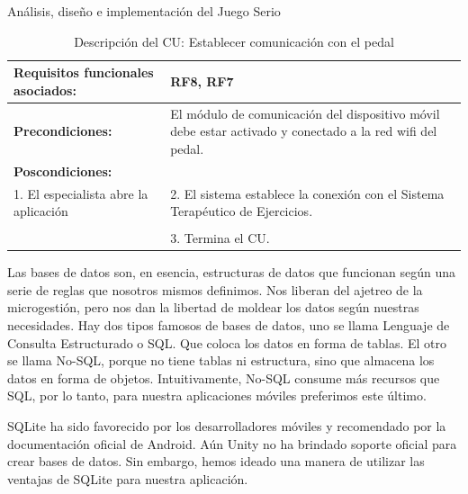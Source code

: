 \begin{thesischapter}{2} {Análisis, diseño e implementación del Juego Serio}
\begin{center}
\begin{table}
\begin{tabularx}{0.95\textwidth}{|X|X|}
                \textbf{Requisitos funcionales asociados:} & RF8, RF7 \\\hline
                \textbf{Precondiciones:} & El módulo de comunicación del dispositivo móvil debe estar activado y conectado a la red wifi del pedal. \\\hline
                \textbf{Poscondiciones:} &  \\\hline
                
                1. El especialista abre la aplicación & 2. El sistema establece la conexión con el Sistema Terapéutico de Ejercicios. \\\\ &3. Termina el CU. \\\hline
            \end{tabularx}

            \caption{Descripción del CU: Establecer comunicación con el pedal}
        \end{table}
    \end{center}
    
    
    



    Las bases de datos son, en esencia, estructuras de datos que funcionan según una serie de reglas que nosotros mismos 
    definimos. Nos liberan del ajetreo de la microgestión, pero nos dan la libertad de moldear los datos según nuestras 
    necesidades. Hay dos tipos famosos de bases de datos, uno se llama Lenguaje de Consulta Estructurado o SQL. Que coloca 
    los datos en forma de tablas. El otro se llama No-SQL, porque no tiene tablas ni estructura, sino que almacena los 
    datos en forma de objetos. Intuitivamente, No-SQL consume más recursos que SQL, por lo tanto, para nuestra aplicaciones 
    móviles preferimos este último.

    \vspace{10pt}
    SQLite ha sido favorecido por los desarrolladores móviles y recomendado por la documentación oficial de Android. Aún  
    Unity no ha brindado soporte oficial para crear bases de datos. Sin embargo, hemos ideado una manera de utilizar las 
    ventajas de SQLite para nuestra aplicación. 
    

\end{thesischapter}
